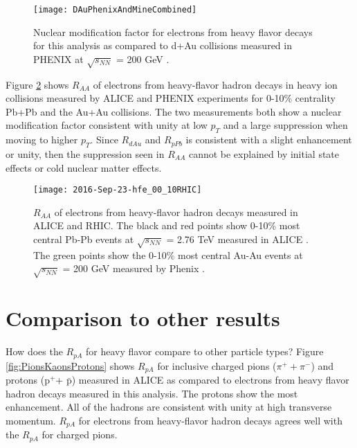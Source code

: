 \begin{figure}[h]
  \centering
  \texttt{[image: DAuPhenixAndMineCombined]}\\
  \caption{Nuclear modification factor for electrons from heavy flavor decays for this analysis as compared to d+Au collisions measured in PHENIX at $\sqrt{s_{NN}}$ = 200 GeV \cite{Adare:2012yxa}. } \label{fig:DAuPhenixAndMineCombined}
\end{figure}


Figure \ref{fig:2016-Sep-23-hfe_00_10RHIC} shows $R_{AA}$ of electrons from heavy-flavor hadron decays in heavy ion collisions measured by ALICE and PHENIX \cite{Adare:2006nq} experiments for 0-10\% centrality Pb+Pb and the Au+Au collisions. The two measurements both show a nuclear modification factor consistent with unity at low $p_{T}$ and a large suppression when moving to higher $p_{T}$. Since $R_{dAu}$ and $R_{pPb}$ is consistent with a slight enhancement or unity, then the suppression seen in $R_{AA}$ cannot be explained by initial state effects or cold nuclear matter effects. 

\begin{figure}[h]
  \centering
  \texttt{[image: 2016-Sep-23-hfe\_00\_10RHIC]}\\
  \caption{$R_{AA}$ of electrons from heavy-flavor hadron decays measured in ALICE and RHIC. The black and red points show 0-10\% most central Pb-Pb events at $\sqrt{s_{NN}}$ = 2.76 TeV measured in ALICE \cite{HFERAAPbPb}. The green points show the 0-10\% most central Au-Au events at $\sqrt{s_{NN}}$ = 200 GeV measured by Phenix \cite{Adare:2006nq}. } \label{fig:2016-Sep-23-hfe_00_10RHIC}
\end{figure}




\section{Comparison to other results}

How does the $R_{pA}$ for heavy flavor compare to other particle types? Figure \ref{fig:PionsKaonsProtons} shows $R_{pA}$ for  inclusive charged pions ($\pi ^{+} + \pi^{-}$) and protons (p$^{+}$+ $\bar{\mathrm{p}}$) measured in ALICE \cite{Adam:2016dau} as compared to electrons from heavy flavor hadron decays measured in this analysis. The protons show the most enhancement. All of the hadrons are consistent with unity at high transverse momentum. $R_{pA}$ for electrons from heavy-flavor hadron decays agrees well with the $R_{pA}$ for charged pions.

